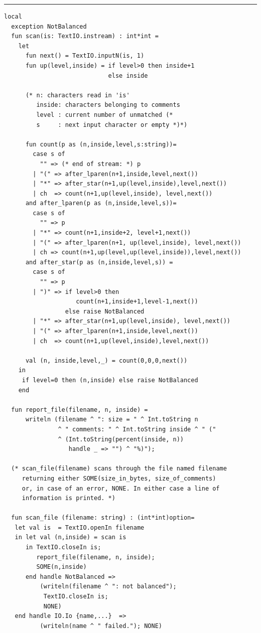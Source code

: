 \documentclass[12pt]{book}
\begin{document}
\bigskip
\hrule
\begin{verbatim}
local
  exception NotBalanced
  fun scan(is: TextIO.instream) : int*int =
    let
      fun next() = TextIO.inputN(is, 1)
      fun up(level,inside) = if level>0 then inside+1 
                             else inside

      (* n: characters read in 'is'
         inside: characters belonging to comments
         level : current number of unmatched (* 
         s     : next input character or empty *)*)

      fun count(p as (n,inside,level,s:string))=
        case s of
          "" => (* end of stream: *) p
        | "(" => after_lparen(n+1,inside,level,next())
        | "*" => after_star(n+1,up(level,inside),level,next())
        | ch  => count(n+1,up(level,inside), level,next())
      and after_lparen(p as (n,inside,level,s))=
        case s of
          "" => p
        | "*" => count(n+1,inside+2, level+1,next())
        | "(" => after_lparen(n+1, up(level,inside), level,next())
        | ch => count(n+1,up(level,up(level,inside)),level,next())
      and after_star(p as (n,inside,level,s)) =
        case s of
          "" => p
        | ")" => if level>0 then
                    count(n+1,inside+1,level-1,next())
                 else raise NotBalanced
        | "*" => after_star(n+1,up(level,inside), level,next())
        | "(" => after_lparen(n+1,inside,level,next())
        | ch  => count(n+1,up(level,inside),level,next())
    
      val (n, inside,level,_) = count(0,0,0,next())
    in
     if level=0 then (n,inside) else raise NotBalanced
    end
  
  fun report_file(filename, n, inside) = 
      writeln (filename ^ ": size = " ^ Int.toString n
               ^ " comments: " ^ Int.toString inside ^ " ("
               ^ (Int.toString(percent(inside, n)) 
                  handle _ => "") ^ "%)");

  (* scan_file(filename) scans through the file named filename 
     returning either SOME(size_in_bytes, size_of_comments)
     or, in case of an error, NONE. In either case a line of
     information is printed. *)

  fun scan_file (filename: string) : (int*int)option=
   let val is  = TextIO.openIn filename 
   in let val (n,inside) = scan is
      in TextIO.closeIn is; 
         report_file(filename, n, inside);
         SOME(n,inside)
      end handle NotBalanced => 
          (writeln(filename ^ ": not balanced");
           TextIO.closeIn is;
           NONE)
   end handle IO.Io {name,...}  => 
          (writeln(name ^ " failed."); NONE)
  

\end{verbatim}
\end{document}
